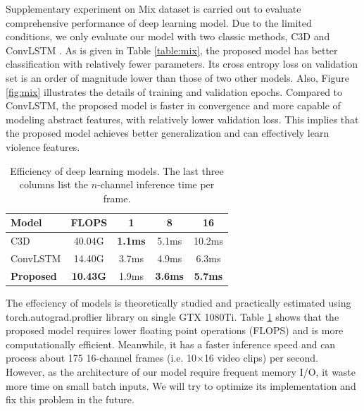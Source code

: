 \documentclass[10pt,twocolumn,letterpaper]{article}
\begin{document}

Supplementary experiment on Mix dataset is carried out to evaluate comprehensive performance of deep learning model.
Due to the limited conditions, we only evaluate our model with two classic methods, C3D \cite{3dcnn_1} and ConvLSTM \cite{convlstm_sudh}. 
As is given in Table \ref{table:mix}, the proposed model has better classification with relatively fewer parameters.
Its cross entropy loss on validation set is an order of magnitude lower than those of two other models.
Also, Figure \ref{fig:mix} illustrates the details of training and validation epochs. 
Compared to ConvLSTM, the proposed model is faster in convergence and more capable of modeling abstract features, with relatively lower validation loss.
This implies that the proposed model achieves better generalization and can effectively learn violence features.


\begin{table}
\begin{center}
\caption{Efficiency of deep learning models. The last three columns list the $n$-channel inference time per frame.}
\label{table:efficiency}
\begin{tabular}{lcccc}
\hline
\textbf{Model} & \textbf{FLOPS} & \textbf{1} & \textbf{8} & \textbf{16}\\
\hline\hline
C3D & 40.04G & \textbf{1.1ms} & 5.1ms & 10.2ms \\
ConvLSTM & 14.40G & 3.7ms & 4.9ms & 6.3ms \\
\textbf{Proposed} & \textbf{10.43G} & 1.9ms & \textbf{3.6ms} & \textbf{5.7ms} \\
\hline
\end{tabular}
\end{center}
\end{table}


The effeciency of models is theoretically studied and practically estimated using torch.autograd.proflier library on single GTX 1080Ti.
Table \ref{table:efficiency} shows that the proposed model requires lower floating point operations (FLOPS) and is more computationally efficient.
Meanwhile, it has a faster inference speed and can process about 175 16-channel frames (i.e. 10$\times$16 video clips) per second.
However, as the architecture of our model require frequent memory I/O, it waste more time on small batch inputs. 
We will try to optimize its implementation and fix this problem in the future.
 
\end{document}
